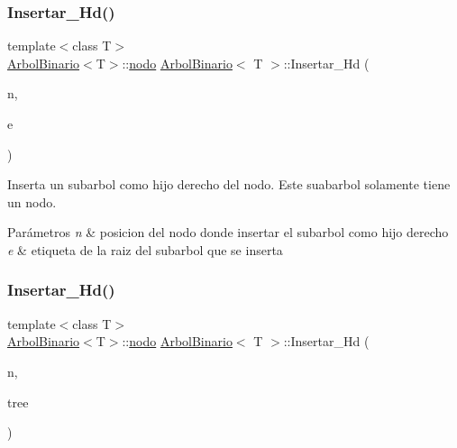 \subsubsection{\texorpdfstring{Insertar\+\_\+\+Hd()}{Insertar\_Hd()}\hspace{0.1cm}{\footnotesize\ttfamily [1/2]}}
{\footnotesize\ttfamily template$<$class T$>$ \\
\hyperlink{classArbolBinario}{Arbol\+Binario}$<$T$>$\+::\hyperlink{classArbolBinario_1_1nodo}{nodo} \hyperlink{classArbolBinario}{Arbol\+Binario}$<$ T $>$\+::Insertar\+\_\+\+Hd (\begin{DoxyParamCaption}\item[{typename \hyperlink{classArbolBinario}{Arbol\+Binario}$<$ T $>$\+::\hyperlink{classArbolBinario_1_1nodo}{nodo}}]{n,  }\item[{const T \&}]{e }\end{DoxyParamCaption})}



Inserta un subarbol como hijo derecho del nodo. Este suabarbol solamente tiene un nodo. 


\begin{DoxyParams}{Parámetros}
{\em n} & posicion del nodo donde insertar el subarbol como hijo derecho \\
\hline
{\em e} & etiqueta de la raiz del subarbol que se inserta \\
\hline
\end{DoxyParams}
\mbox{\label{classArbolBinario_a7e0b2453f969c6289809aaba1f03fe62}} 
\subsubsection{\texorpdfstring{Insertar\+\_\+\+Hd()}{Insertar\_Hd()}\hspace{0.1cm}{\footnotesize\ttfamily [2/2]}}
{\footnotesize\ttfamily template$<$class T$>$ \\
\hyperlink{classArbolBinario}{Arbol\+Binario}$<$T$>$\+::\hyperlink{classArbolBinario_1_1nodo}{nodo} \hyperlink{classArbolBinario}{Arbol\+Binario}$<$ T $>$\+::Insertar\+\_\+\+Hd (\begin{DoxyParamCaption}\item[{typename \hyperlink{classArbolBinario}{Arbol\+Binario}$<$ T $>$\+::\hyperlink{classArbolBinario_1_1nodo}{nodo}}]{n,  }\item[{\hyperlink{classArbolBinario}{Arbol\+Binario}$<$ T $>$ \&}]{tree }\end{DoxyParamCaption})}



